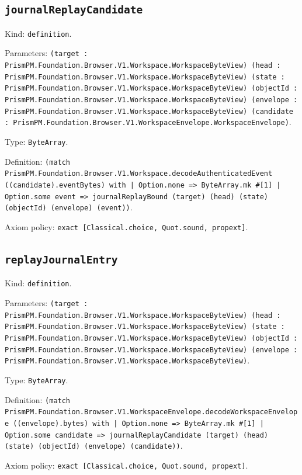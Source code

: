 \documentclass[11pt]{article}
\begin{document}
\subsection*{\texttt{journalReplayCandidate}}
\noindent Kind: \texttt{definition}.\par
\noindent Parameters: \texttt{(target : PrismPM.Foundation.Browser.V1.Workspace.WorkspaceByteView) (head : PrismPM.Foundation.Browser.V1.Workspace.WorkspaceByteView) (state : PrismPM.Foundation.Browser.V1.Workspace.WorkspaceByteView) (objectId : PrismPM.Foundation.Browser.V1.Workspace.WorkspaceByteView) (envelope : PrismPM.Foundation.Browser.V1.Workspace.WorkspaceByteView) (candidate : PrismPM.Foundation.Browser.V1.WorkspaceEnvelope.WorkspaceEnvelope)}.\par
\noindent Type: \texttt{ByteArray}.\par
\noindent Definition: \texttt{(match PrismPM.Foundation.Browser.V1.Workspace.decodeAuthenticatedEvent ((candidate).eventBytes) with | Option.none => ByteArray.mk \#[1] | Option.some event => journalReplayBound (target) (head) (state) (objectId) (envelope) (event))}.\par
\noindent Axiom policy: \texttt{exact [Classical.choice, Quot.sound, propext]}.\par
\subsection*{\texttt{replayJournalEntry}}
\noindent Kind: \texttt{definition}.\par
\noindent Parameters: \texttt{(target : PrismPM.Foundation.Browser.V1.Workspace.WorkspaceByteView) (head : PrismPM.Foundation.Browser.V1.Workspace.WorkspaceByteView) (state : PrismPM.Foundation.Browser.V1.Workspace.WorkspaceByteView) (objectId : PrismPM.Foundation.Browser.V1.Workspace.WorkspaceByteView) (envelope : PrismPM.Foundation.Browser.V1.Workspace.WorkspaceByteView)}.\par
\noindent Type: \texttt{ByteArray}.\par
\noindent Definition: \texttt{(match PrismPM.Foundation.Browser.V1.WorkspaceEnvelope.decodeWorkspaceEnvelope ((envelope).bytes) with | Option.none => ByteArray.mk \#[1] | Option.some candidate => journalReplayCandidate (target) (head) (state) (objectId) (envelope) (candidate))}.\par
\noindent Axiom policy: \texttt{exact [Classical.choice, Quot.sound, propext]}.\par
\end{document}
